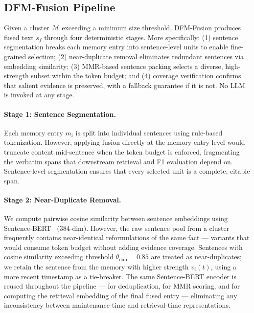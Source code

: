 \subsection{DFM-Fusion Pipeline}

Given a cluster $\mathcal{M}$ exceeding a minimum size threshold, DFM-Fusion produces fused text $s_f$ through four deterministic stages. More specifically: (1) sentence segmentation breaks each memory entry into sentence-level units to enable fine-grained selection; (2) near-duplicate removal eliminates redundant sentences via embedding similarity; (3) MMR-based sentence packing selects a diverse, high-strength subset within the token budget; and (4) coverage verification confirms that salient evidence is preserved, with a fallback guarantee if it is not. No LLM is invoked at any stage.

\paragraph{Stage 1: Sentence Segmentation.}
Each memory entry $m_i$ is split into individual sentences using rule-based tokenization. However, applying fusion directly at the memory-entry level would truncate content mid-sentence when the token budget is enforced, fragmenting the verbatim spans that downstream retrieval and F1 evaluation depend on. Sentence-level segmentation ensures that every selected unit is a complete, citable span.

\paragraph{Stage 2: Near-Duplicate Removal.}
We compute pairwise cosine similarity between sentence embeddings using Sentence-BERT~\citep{Reimers2019SentenceBERTSE} (384-dim). However, the raw sentence pool from a cluster frequently contains near-identical reformulations of the same fact --- variants that would consume token budget without adding evidence coverage. Sentences with cosine similarity exceeding threshold $\theta_{\text{dup}} = 0.85$ are treated as near-duplicates; we retain the sentence from the memory with higher strength $v_i(t)$, using a more recent timestamp as a tie-breaker. The same Sentence-BERT encoder is reused throughout the pipeline --- for deduplication, for MMR scoring, and for computing the retrieval embedding of the final fused entry --- eliminating any inconsistency between maintenance-time and retrieval-time representations.

